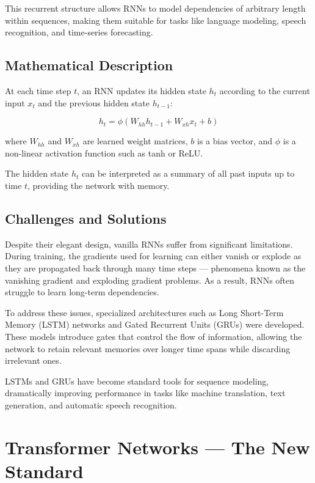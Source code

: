 \documentclass[openany]{book}
\begin{document}
This recurrent structure allows RNNs to model dependencies of arbitrary length 
within sequences, making them suitable for tasks like language modeling, speech 
recognition, and time-series forecasting.

\subsection{Mathematical Description}

At each time step $t$, an RNN updates its hidden state $h_t$ according to the 
current input $x_t$ and the previous hidden state $h_{t-1}$:

\begin{equation}
h_t = \phi(W_{hh}h_{t-1} + W_{xh}x_t + b)
\end{equation}

where $W_{hh}$ and $W_{xh}$ are learned weight matrices, $b$ is a bias vector, 
and $\phi$ is a non-linear activation function such as tanh or ReLU.

The hidden state $h_t$ can be interpreted as a summary of all past inputs up to 
time $t$, providing the network with memory.

\subsection{Challenges and Solutions}

Despite their elegant design, vanilla RNNs suffer from significant limitations. 
During training, the gradients used for learning can either vanish or explode as 
they are propagated back through many time steps — phenomena known as the 
vanishing gradient and exploding gradient problems. As a result, RNNs often 
struggle to learn long-term dependencies.

To address these issues, specialized architectures such as Long Short-Term 
Memory (LSTM) networks and Gated Recurrent Units (GRUs) were developed. These
models introduce gates that control the flow of information, allowing the 
network to retain relevant memories over longer time spans while discarding 
irrelevant ones.

LSTMs and GRUs have become standard tools for sequence modeling, dramatically 
improving performance in tasks like machine translation, text generation, and 
automatic speech recognition.

\section{Transformer Networks — The New Standard}
\end{document}
